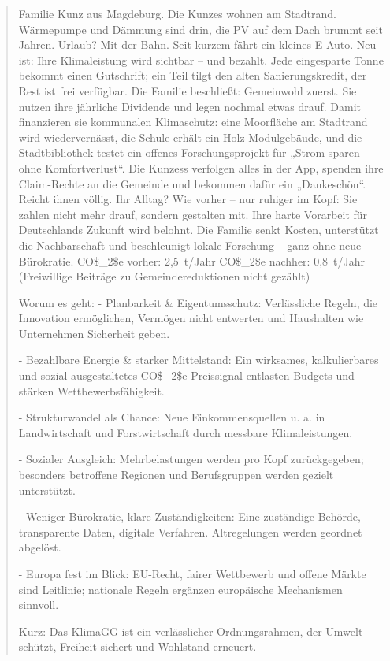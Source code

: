\documentclass[12pt,a4paper]{scrartcl}
\begin{document}
\begin{quote}
Familie Kunz aus Magdeburg. Die Kunzes wohnen am Stadtrand. Wärmepumpe und Dämmung sind drin, die PV auf dem Dach brummt seit Jahren. Urlaub? Mit der Bahn. Seit kurzem fährt ein kleines E-Auto. Neu ist: Ihre Klimaleistung wird sichtbar -- und bezahlt. Jede eingesparte Tonne bekommt einen Gutschrift; ein Teil tilgt den alten Sanierungskredit, der Rest ist frei verfügbar. Die Familie beschließt: Gemeinwohl zuerst. Sie nutzen ihre jährliche Dividende und legen nochmal etwas drauf. Damit finanzieren sie kommunalen Klimaschutz: eine Moorfläche am Stadtrand wird wiedervernässt, die Schule erhält ein Holz-Modulgebäude, und die Stadtbibliothek testet ein offenes Forschungsprojekt für „Strom sparen ohne Komfortverlust“. Die Kunzess verfolgen alles in der App, spenden ihre Claim-Rechte an die Gemeinde und bekommen dafür ein „Dankeschön“. Reicht ihnen völlig. Ihr Alltag? Wie vorher -- nur ruhiger im Kopf: Sie zahlen nicht mehr drauf, sondern gestalten mit. Ihre harte Vorarbeit für Deutschlands Zukunft wird belohnt. Die Familie senkt Kosten, unterstützt die Nachbarschaft und beschleunigt lokale Forschung -- ganz ohne neue Bürokratie. CO\$\_2\$e vorher: 2,5 t/Jahr  CO\$\_2\$e nachher: 0,8 t/Jahr (Freiwillige Beiträge zu Gemeindereduktionen nicht gezählt)

    Worum es geht:
- Planbarkeit \& Eigentumsschutz: Verlässliche Regeln, die Innovation ermöglichen, Vermögen nicht entwerten und Haushalten wie Unternehmen Sicherheit geben.

- Bezahlbare Energie \& starker Mittelstand: Ein wirksames, kalkulierbares und sozial ausgestaltetes CO\$\_2\$e-Preissignal entlasten Budgets und stärken Wettbewerbsfähigkeit.

- Strukturwandel als Chance: Neue Einkommensquellen u. a. in Landwirtschaft und Forstwirtschaft durch messbare Klimaleistungen.

- Sozialer Ausgleich: Mehrbelastungen werden pro Kopf zurückgegeben; besonders betroffene Regionen und Berufsgruppen werden gezielt unterstützt.

- Weniger Bürokratie, klare Zuständigkeiten: Eine zuständige Behörde, transparente Daten, digitale Verfahren. Altregelungen werden geordnet abgelöst.

- Europa fest im Blick: EU-Recht, fairer Wettbewerb und offene Märkte sind Leitlinie; nationale Regeln ergänzen europäische Mechanismen sinnvoll.

    Kurz: Das KlimaGG ist ein verlässlicher Ordnungsrahmen, der Umwelt schützt, Freiheit sichert und Wohlstand erneuert.
\end{quote}
\end{document}

